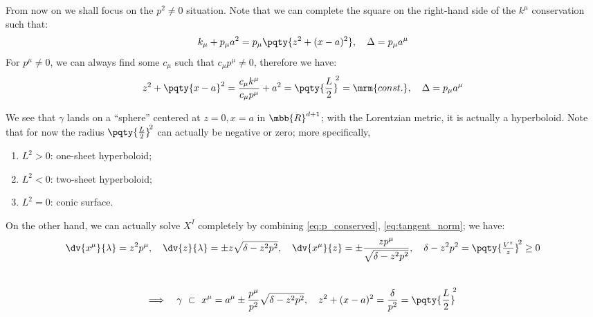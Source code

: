 \documentclass[a4paper,10pt]{article}
\begin{document}
	From now on we shall focus on the $p^2 \ne 0$ situation. Note that we can complete the square on the right-hand side of the $k^\mu$ conservation such that:
	\begin{equation}
		k_\mu + p_\mu a^2
		= p_\mu \pqty{
			z^2 + (x - a)^2
		},
	\quad \Delta = p_\mu a^\mu
	\end{equation}
	For $p^\mu \ne 0$, we can always find some $c_\mu$ such that $c_\mu p^\mu \ne 0$, therefore we have:
	\begin{equation}
		z^2 + \pqty{x - a}^2
		= \frac{c_\mu k^\mu}{c_\mu p^\mu}
			+ a^2
		= \pqty{\frac{L}{2}}^{\!\!2}
		= \mrm{const.},
	\quad \Delta = p_\mu a^\mu
	\end{equation}
	
	We see that $\gamma$ lands on a ``sphere'' centered at $z = 0, x = a$ in $\mbb{R}^{d+1}$; with the Lorentzian metric, it is actually a hyperboloid. Note that for now the radius $\pqty{\frac{L}{2}}^{\!2}$ can actually be negative or zero; more specifically,
	\begin{enumerate}[noitemsep]
	\item $L^2 > 0$: one-sheet hyperboloid;
	\item $L^2 < 0$: two-sheet hyperboloid;
	\item $L^2 = 0$: conic surface. 
	\end{enumerate}
	On the other hand, we can actually solve $X^I$ completely by combining \eqref{eq:p_conserved}, \eqref{eq:tangent_norm}; we have:
	\begin{equation}
		\dv{x^\mu}{\lambda} = z^2 p^\mu,
	\quad
		\dv{z}{\lambda}
		= \pm z\sqrt{\delta - z^2 p^2},
	\quad
		\dv{x^\mu}{z}
		= \pm \frac{zp^\mu}{\sqrt{\delta - z^2 p^2}},
	\quad
		\delta - z^2 p^2
		= \pqty{\tfrac{V^z}{z}}^{\!2} \ge 0
	\end{equation}
	\\[-1.5\baselineskip]
	\begin{equation}
	\Longrightarrow\quad
		\gamma \ \subset\ %
		x^\mu
		= a^\mu \pm\frac{p^\mu}{p^2}
			\sqrt{\delta - z^2 p^2},
	\quad
		z^2 + (x - a)^2
		= \frac{\delta}{p^2}
		= \pqty{\frac{L}{2}}^{\!\!2}
	\label{eq:unified_geodesic}
	\end{equation}
	
\end{document}
